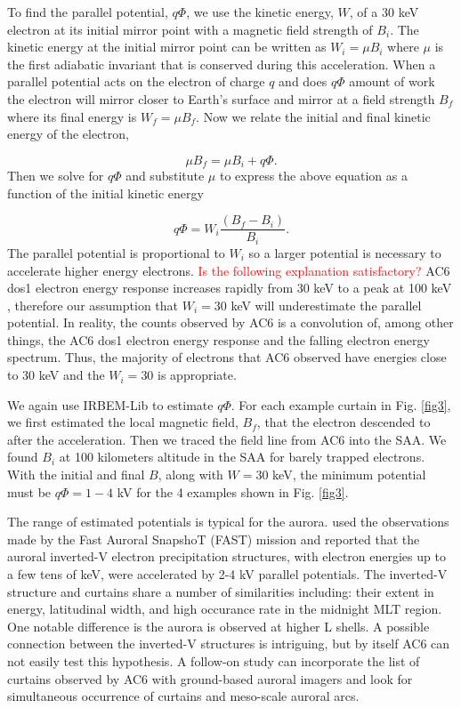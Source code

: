 \documentclass[draft]{agujournal2019}
\begin{document}
To find the parallel potential, $q \Phi$,  we use the kinetic energy, $W$, of a $30$ keV electron at its initial mirror point with a magnetic field strength of $B_i$. The kinetic energy at the initial mirror point can be written as $W_i = \mu B_i$ where $\mu$ is the first adiabatic invariant that is conserved during this acceleration. When a parallel potential acts on the electron of charge $q$ and does $q \Phi$ amount of work the electron will mirror closer to Earth's surface and mirror at a field strength $B_f$ where its final energy is $W_f = \mu B_f$. Now we relate the initial and final kinetic energy of the electron,

\begin{equation}
\mu B_f = \mu B_i + q \Phi.
\end{equation} Then we solve for $q \Phi$ and substitute $\mu$ to express the above equation as a function of the initial kinetic energy 

\begin{equation}
 q \Phi = W_i \frac{(B_f - B_i)}{B_i}.
\end{equation} The parallel potential is proportional to $W_i$ so a larger potential is necessary to accelerate higher energy electrons. \textcolor{red}{Is the following explanation satisfactory?} AC6 dos1 electron energy response increases rapidly from 30 keV to a peak at 100 keV \cite[Figure 2]{O'brien2019}, therefore our assumption that $W_i = 30$ keV will underestimate the parallel potential. In reality, the counts observed by AC6 is a convolution of, among other things, the AC6 dos1 electron energy response and the falling electron energy spectrum. Thus, the majority of electrons that AC6 observed have energies close to 30 keV and the $W_i = 30$ is appropriate.

We again use IRBEM-Lib to estimate $ q \Phi$. For each example curtain in Fig. \ref{fig3}, we first estimated the local magnetic field, $B_f$, that the electron descended to after the acceleration. Then we traced the field line from AC6 into the SAA. We found $B_i$ at 100 kilometers altitude in the SAA for barely trapped electrons. With the initial and final $B$, along with $W = 30$ keV, the minimum potential must be $q \Phi = 1-4$ kV for the 4 examples shown in Fig. \ref{fig3}. 

The range of estimated potentials is typical for the aurora.  used the observations made by the Fast Auroral SnapshoT (FAST) mission and reported that the auroral inverted-V electron precipitation structures, with electron energies up to a few tens of keV, were accelerated by 2-4 kV parallel potentials. The inverted-V structure and curtains share a number of similarities including: their extent in energy, latitudinal width, and high occurance rate in the midnight MLT region. One notable difference is the aurora is observed at higher L shells. A possible connection between the inverted-V structures is intriguing, but by itself AC6 can not easily test this hypothesis. A follow-on study can incorporate the list of curtains observed by AC6 with ground-based auroral imagers and look for simultaneous occurrence of curtains and meso-scale auroral arcs.
\end{document}
